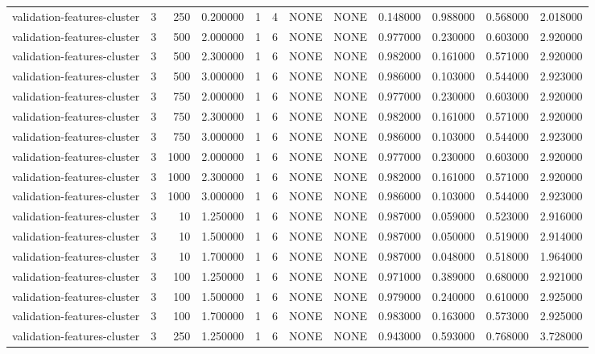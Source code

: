 \begin{tabular}{lrrrllllrrrr}
validation-features-cluster & 3 & 250 & 0.200000 & 1 & 4 & NONE & NONE & 0.148000 & 0.988000 & 0.568000 & 2.018000 \\
validation-features-cluster & 3 & 500 & 2.000000 & 1 & 6 & NONE & NONE & 0.977000 & 0.230000 & 0.603000 & 2.920000 \\
validation-features-cluster & 3 & 500 & 2.300000 & 1 & 6 & NONE & NONE & 0.982000 & 0.161000 & 0.571000 & 2.920000 \\
validation-features-cluster & 3 & 500 & 3.000000 & 1 & 6 & NONE & NONE & 0.986000 & 0.103000 & 0.544000 & 2.923000 \\
validation-features-cluster & 3 & 750 & 2.000000 & 1 & 6 & NONE & NONE & 0.977000 & 0.230000 & 0.603000 & 2.920000 \\
validation-features-cluster & 3 & 750 & 2.300000 & 1 & 6 & NONE & NONE & 0.982000 & 0.161000 & 0.571000 & 2.920000 \\
validation-features-cluster & 3 & 750 & 3.000000 & 1 & 6 & NONE & NONE & 0.986000 & 0.103000 & 0.544000 & 2.923000 \\
validation-features-cluster & 3 & 1000 & 2.000000 & 1 & 6 & NONE & NONE & 0.977000 & 0.230000 & 0.603000 & 2.920000 \\
validation-features-cluster & 3 & 1000 & 2.300000 & 1 & 6 & NONE & NONE & 0.982000 & 0.161000 & 0.571000 & 2.920000 \\
validation-features-cluster & 3 & 1000 & 3.000000 & 1 & 6 & NONE & NONE & 0.986000 & 0.103000 & 0.544000 & 2.923000 \\
validation-features-cluster & 3 & 10 & 1.250000 & 1 & 6 & NONE & NONE & 0.987000 & 0.059000 & 0.523000 & 2.916000 \\
validation-features-cluster & 3 & 10 & 1.500000 & 1 & 6 & NONE & NONE & 0.987000 & 0.050000 & 0.519000 & 2.914000 \\
validation-features-cluster & 3 & 10 & 1.700000 & 1 & 6 & NONE & NONE & 0.987000 & 0.048000 & 0.518000 & 1.964000 \\
validation-features-cluster & 3 & 100 & 1.250000 & 1 & 6 & NONE & NONE & 0.971000 & 0.389000 & 0.680000 & 2.921000 \\
validation-features-cluster & 3 & 100 & 1.500000 & 1 & 6 & NONE & NONE & 0.979000 & 0.240000 & 0.610000 & 2.925000 \\
validation-features-cluster & 3 & 100 & 1.700000 & 1 & 6 & NONE & NONE & 0.983000 & 0.163000 & 0.573000 & 2.925000 \\
validation-features-cluster & 3 & 250 & 1.250000 & 1 & 6 & NONE & NONE & 0.943000 & 0.593000 & 0.768000 & 3.728000 \\

\end{tabular}
